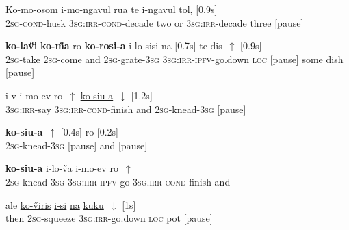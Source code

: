 \documentclass[output=paper]{LSP/langsci}
\begin{document}
  \begin{exe}
\ex \label{Guapp7}
\gll    Ko-mo-osom       i-mo-ngavul                rua   te     i-ngavul    tol, [0.9s]\\     	       
 \textsc{2sg}-\textsc{cond}-husk   \textsc{3sg:irr-cond}-decade   two   or     \textsc{3sg:irr}-decade    three [pause]\\
\glt {} 
\end{exe}

  \begin{exe}
\ex \label{Guapp8}
\gll    \textbf{ko-la\H{v}i}      \textbf{ko-\H{m}a} ro      \textbf{ko-rosi-a}  i-lo-sisi                 na  [0.7s] te dis~$\uparrow$ [0.9s]\\     	       
 \textsc{2sg}-take   \textsc{2sg}-come  and \textsc{2sg}-grate-\textsc{3sg} \textsc{3sg:irr-ipfv}-go.down   \textsc{loc} [pause] some dish [pause]\\
\glt {} 
\end{exe}

  \begin{exe}
\ex \label{Guapp9}
\gll  i-v             i-mo-ev                  ro~$\uparrow$     \underline{ko-siu-a}~$\downarrow$  [1.2s]  \\     	       
 \textsc{3sg:irr}-say   \textsc{3sg:irr-cond}-finish   and   \textsc{2sg}-knead-\textsc{3sg}  [pause]\\
\glt {} 
\end{exe}

  \begin{exe}
\ex \label{Guapp10}
\gll  \textbf{ko-siu-a}~$\uparrow$  [0.4s] ro [0.2s] \\     	       
\textsc{2sg}-knead-\textsc{3sg} [pause]  and [pause]\\
\glt {} 
\end{exe}


  \begin{exe}
\ex \label{Guapp11}
\gll  \textbf{ko-siu-a} i-lo-\H{v}a                  i-mo-ev                  ro~$\uparrow$   \\     	       
\textsc{2sg}-knead-\textsc{3sg} \textsc{3sg:irr-ipfv}-go     \textsc{3sg.irr-cond}-finish   and  \\
\glt {} 
\end{exe}

  \begin{exe}
\ex \label{Guapp12}
\gll  ale    \underline{ko-\H{v}iris}          \underline{i-si}                 \underline{na}   \underline{kuku}~$\downarrow$  [1s]\\     	       
then   \textsc{2sg}-squeeze     \textsc{3sg:irr-}go.down   \textsc{loc}  pot  [pause]\\
\glt {} 
\end{exe}
\end{document}
